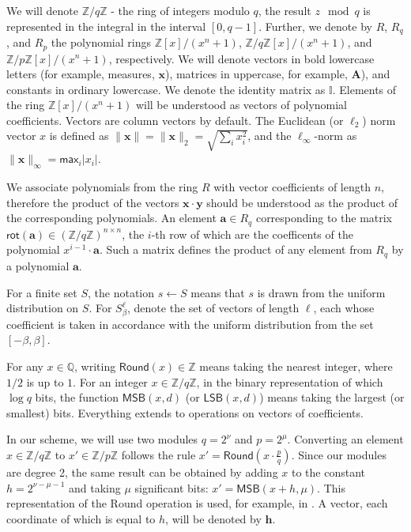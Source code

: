 \documentclass{article}
\theoremstyle{plain}
\theoremstyle{definition}
\begin{document}
    We will denote $\mathbb{Z}/q\mathbb{Z}$ - the ring of integers modulo $q$, the result $z \mod q$ is represented in the integral in the interval $[0, q-1]$. Further, we denote by $R$, $R_q$, and $R_p$ the polynomial rings $\mathbb{Z}[x]/(x^n + 1)$, $\mathbb{Z}/q\mathbb{Z}[x]/(x^n + 1)$, and $\mathbb{Z}/p\mathbb{Z}[x]/(x^n + 1)$, respectively. We will denote vectors in bold lowercase letters (for example, measures, $\mathbf{x}$), matrices in uppercase, for example, $\mathbf{A}$), and constants in ordinary lowercase. We denote the identity matrix as $\mathbb{I}$. Elements of the ring $\mathbb{Z}[x]/(x^n + 1)$ will be understood as vectors of polynomial coefficients. Vectors are column vectors by default. The Euclidean (or $\ell_2$) norm vector $x$ is defined as $\|\mathbf{x}\| = \|\mathbf{x}\|_2 = \sqrt{\sum_{i} x^2_i}$, and the $\ell_\infty$-norm as $\|\mathbf{x}\|_\infty = \mathsf{max}_i|x_i|$.

    We associate polynomials from the ring $R$ with vector coefficients of length $n$, therefore the product of the vectors $\mathbf{x} \cdot \mathbf{y}$ should be understood as the product of the corresponding polynomials. An element $\mathbf{a} \in R_q$ corresponding to the matrix $\mathsf{rot}(\mathbf{a}) \in (\mathbb{Z}/q\mathbb{Z})^{n \times n}$, the $i$-th row of which are the coefficents of the polynomial $x^{i - 1} \cdot \mathbf{a}$. Such a matrix defines the product of any element from $R_q$ by a polynomial $\mathbf{a}$.
    
    For a finite set $S$, the notation $s \leftarrow S$ means that $s$ is drawn from the uniform distribution on $S$. For $S^\ell_\beta$, denote the set of vectors of length $\ell$, each whose coefficient is taken in accordance with the uniform distribution from the set $[- \beta, \beta]$.

    For any $x \in \mathbb{Q}$, writing $\mathsf{Round}(x) \in \mathbb{Z}$ means taking the nearest integer, where $1/2$ is up to $1$. For an integer $x \in \mathbb{Z}/q\mathbb{Z}$, in the binary representation of which $\log q$ bits, the function $\mathsf{MSB}(x, d)$ (or $\mathsf{LSB}(x, d)$) means taking the largest (or smallest) bits. Everything extends to operations on vectors of coefficients.
    
    In our scheme, we will use two modules $q = 2^\nu$ and $p = 2^\mu$. Converting an element $x \in \mathbb{Z}/q\mathbb{Z}$ to $x' \in \mathbb{Z}/p\mathbb{Z}$ follows the rule $x' = \mathsf{Round}(x \cdot \frac{p}{q})$. Since our modules are degree 2, the same result can be obtained by adding $x$ to the constant $h = 2^{\nu - \mu - 1}$ and taking $\mu$ significant bits: $x' = \mathsf{MSB}(x + h, \mu)$. This representation of the Round operation is used, for example, in \cite{DKSRV18}. A vector, each coordinate of which is equal to $h$, will be denoted by $\mathbf{h}$.
    
\end{document}
